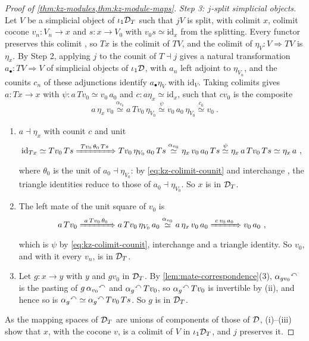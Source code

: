 \begin{proof}[Proof of \cref{thm:kz-modules,thm:kz-module-maps}]
\emph{Step 3: $j$-split simplicial objects.} Let $V$ be a simplicial object of
$\iota_{1}\mathcal{D}_{T}$ such that $jV$ is split, with colimit $x$, colimit cocone
$v_{n}\colon V_{n} \to x$
and
$s\colon x \to V_{0}$
with
$v_{0}s \simeq \mathrm{id}_{x}$
from the splitting. Every functor preserves this colimit
\cite[Rem.~4.7.2.4]{ha}, so $Tx$ is the colimit of $TV$, and the colimit of
$\eta_{V}\colon V \Rightarrow TV$
is $\eta_{x}$. By Step 2, applying $j$ to the counit of $T \dashv j$ gives a
natural transformation
$a_{\bullet}\colon TV \Rightarrow V$
of simplicial objects of $\iota_{1}\mathcal{D}$, with $a_{n}$ left adjoint to
$\eta_{V_{n}}$, and the counits $c_{n}$ of these adjunctions identify
$a_{\bullet}\eta_{V}$ with $\mathrm{id}_{V}$. Taking colimits gives
$a\colon Tx \to x$
with
$\psi\colon a\,Tv_{0} \simeq v_{0}\,a_{0}$
and
$c\colon a\eta_{x} \simeq \mathrm{id}_{x}$,
such that $cv_{0}$ is the composite
\begin{equation}
\label{eq:kz-colimit-counit}
a\,\eta_{x}\,v_{0} \overset{\alpha_{v_{0}}}{\simeq} a\,Tv_{0}\,\eta_{V_{0}}
\overset{\psi}{\simeq} v_{0}\,a_{0}\,\eta_{V_{0}} \overset{c_{0}}{\simeq} v_{0}
\ .
\end{equation}
\begin{enumerate}
\item[(i)] $a \dashv \eta_{x}$ with counit $c$ and unit
\begin{equation*}
\mathrm{id}_{Tx} \simeq Tv_{0}\,Ts \xRightarrow{\ Tv_{0}\,\theta_{0}\,Ts\ }
Tv_{0}\,\eta_{V_{0}}\,a_{0}\,Ts \overset{\alpha_{v_{0}}}{\simeq}
\eta_{x}\,v_{0}\,a_{0}\,Ts \overset{\psi}{\simeq} \eta_{x}\,a\,Tv_{0}\,Ts \simeq
\eta_{x}\,a \ ,
\end{equation*}
where $\theta_{0}$ is the unit of
$a_{0} \dashv \eta_{V_{0}}$:
by \eqref{eq:kz-colimit-counit} and interchange
,
the triangle identities reduce to those of
$a_{0} \dashv \eta_{V_{0}}$.
So $x$ is in $\mathcal{D}_{T}$.
\item[(ii)] The left mate of the unit square of $v_{0}$ is
\begin{equation*}
a\,Tv_{0} \xRightarrow{\ a\,Tv_{0}\,\theta_{0}\ }
a\,Tv_{0}\,\eta_{V_{0}}\,a_{0} \overset{\alpha_{v_{0}}}{\simeq}
a\,\eta_{x}\,v_{0}\,a_{0} \xRightarrow{\ c\,v_{0}\,a_{0}\ } v_{0}\,a_{0} \ ,
\end{equation*}
which is $\psi$ by \eqref{eq:kz-colimit-counit}, interchange and a triangle
identity. So $v_{0}$, and with it every $v_{n}$, is in $\mathcal{D}_{T}$.
\item[(iii)] Let
$g\colon x \to y$
with $y$ and $gv_{0}$ in $\mathcal{D}_{T}$. By \cref{lem:mate-correspondence}(3),
${\alpha_{gv_{0}}}^{\curvearrowleft}$
is the pasting of
$g\,{\alpha_{v_{0}}}^{\curvearrowleft}$
and
${\alpha_{g}}^{\curvearrowleft}\,Tv_{0}$,
so
${\alpha_{g}}^{\curvearrowleft}\,Tv_{0}$
is invertible by (ii), and hence so is
${\alpha_{g}}^{\curvearrowleft} \simeq {\alpha_{g}}^{\curvearrowleft}\,Tv_{0}\,Ts$.
So $g$ is in $\mathcal{D}_{T}$.
\end{enumerate}
As the mapping spaces of $\mathcal{D}_{T}$ are unions of components of those of $\mathcal{D}$,
(i)--(iii) show that $x$, with the cocone $v$, is a colimit of $V$ in
$\iota_{1}\mathcal{D}_{T}$, and $j$ preserves it.


\end{proof}
